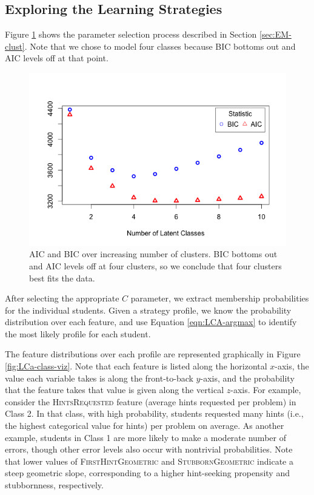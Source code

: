 \documentclass{edm_template}
\newcommand{\ftr}[1]{\textsc{#1}}
\begin{document}
\subsection{Exploring the Learning Strategies}
\label{sec:exploring-classes}

Figure \ref{fig:LCa-test-statistics} shows the parameter selection process described in Section \ref{sec:EM-clust}. Note that we chose to model four classes because BIC bottoms out and AIC levels off at that point.

\begin{figure}[htbp]
\includegraphics[scale=0.4]{LCa-stats-plot.png}
\caption{AIC and BIC over increasing number of clusters. BIC bottoms out and AIC levels off at four clusters, so we conclude that four clusters best fits the data.}
\label{fig:LCa-test-statistics}
\end{figure}

After selecting the appropriate $C$ parameter, we extract membership probabilities for the individual students. Given a strategy profile, we know the probability distribution over each feature, and use Equation \ref{eqn:LCA-argmax} to identify the most likely profile for each student.

The feature distributions over each profile are represented graphically in Figure \ref{fig:LCa-class-viz}. Note that each feature is listed along the horizontal $x$-axis, the value each variable takes is along the front-to-back $y$-axis, and the probability that the feature takes that value is given along the vertical $z$-axis. For example, consider the \ftr{HintsRequested} feature (average hints requested per problem) in Class 2. In that class, with high probability, students requested many hints (i.e., the highest categorical value for hints) per problem on average. As another example, students in Class 1 are more likely to make a moderate number of errors, though other error levels also occur with nontrivial probabilities. Note that lower values of \ftr{FirstHintGeometric} and \ftr{StubbornGeometric} indicate a steep geometric slope, corresponding to a higher hint-seeking propensity and stubbornness, respectively.
\end{document}
